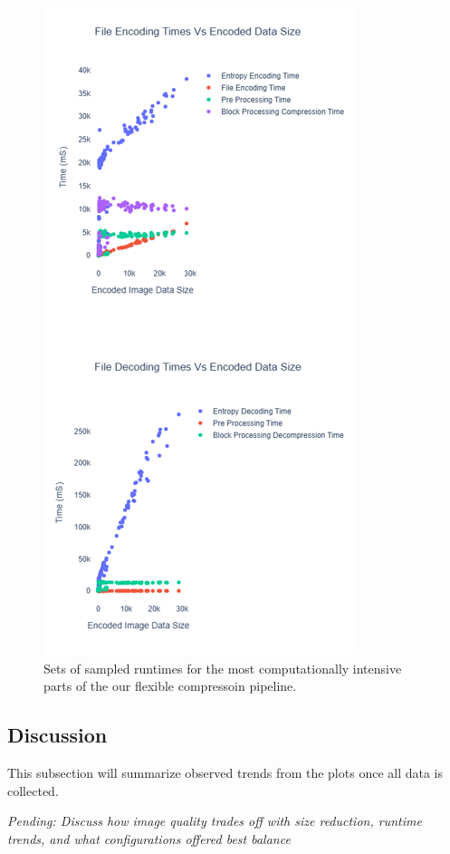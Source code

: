 \begin{figure}
    \includegraphics[options]{assets/Runtimes Summary.png}
    \caption{Sets of sampled runtimes for the most computationally intensive parts of the our flexible compressoin pipeline.}
    \label{fig:runtimes}
\end{figure}

\subsection{Discussion}
This subsection will summarize observed trends from the plots once all data is collected.

\textit{Pending: Discuss how image quality trades off with size reduction, runtime trends, and what configurations offered best balance}